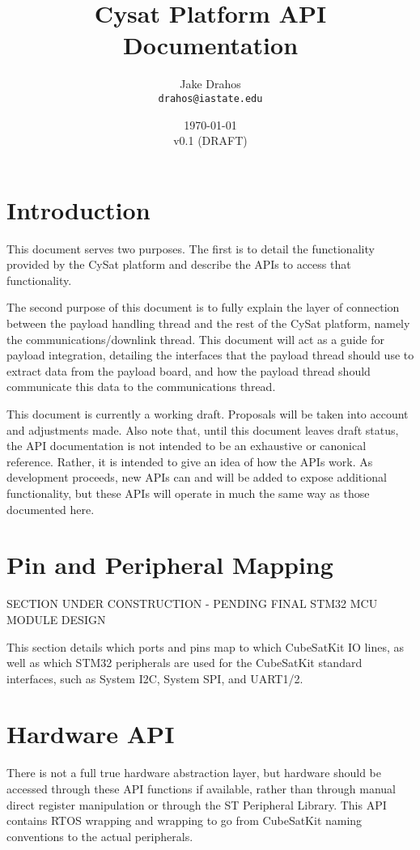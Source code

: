 \documentclass{article}
\begin{document}
\title{Cysat Platform API Documentation}
\author{Jake Drahos \\ \texttt{drahos@iastate.edu}}
\date{\today\\v0.1 (DRAFT)}

\maketitle

\tableofcontents

\section{Introduction}
This document serves two purposes. The first is to detail the functionality 
provided by the CySat platform and
describe the APIs to access that functionality.

The second purpose of this document is to fully explain the layer of connection
between the payload handling thread and the rest of the CySat platform, namely
the communications/downlink thread. This document will act as a guide for
payload integration, detailing the interfaces that the payload thread should
 use
to extract data from the payload board, and how the payload thread should 
communicate this data to the communications thread.

This document is currently a working draft. Proposals will be taken into account
and adjustments made. Also note that, until this document leaves draft status,
the API documentation is not intended to be an exhaustive or canonical
reference. Rather, it is intended to give an idea of how the APIs work. As
development proceeds, new APIs can and will be added to expose additional
functionality, but these APIs will operate in much the same way as those
documented here.

\section{Pin and Peripheral Mapping}

SECTION UNDER CONSTRUCTION - PENDING FINAL STM32 MCU MODULE DESIGN

This section details which ports and pins map to which CubeSatKit IO lines,
as well as which STM32 peripherals are used for the CubeSatKit standard 
interfaces, such as System I2C, System SPI, and UART1/2.

\section{Hardware API}
There is not a full true hardware abstraction layer, but hardware should be
accessed through these API functions if available, rather than through manual
direct register manipulation or through the ST Peripheral Library. This API
contains RTOS wrapping and wrapping to go from CubeSatKit naming conventions
to the actual peripherals.
\end{document}
